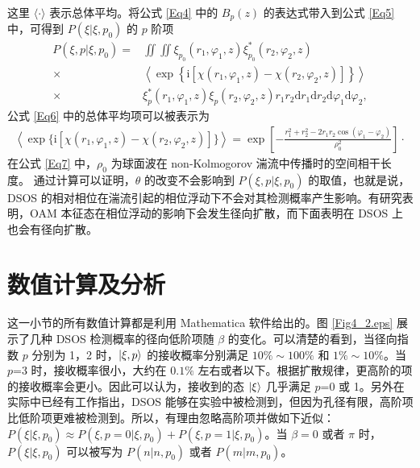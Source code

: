 \documentclass[master]{thesis-uestc}
\begin{document}
\noindent 这里 $\langle\cdot\rangle$ 表示总体平均。将公式 \eqref{Eq4} 中的 $B_p(z)$ 的表达式带入到公式 \eqref{Eq5} 中，可得到 $P(\xi|\xi,p_0)$ 的 $p$ 阶项
\begin{equation}
  \begin{split}
  P(\xi,p|\xi,p_0)=& \iint\iint\xi_{p_0}(r_1,\varphi_1,z)\xi_{p_0}^\ast(r_2,\varphi_2,z) \\
           \times& \left<\exp\left\{\mathrm{i}[\chi(r_1,\varphi_1,z)-\chi(r_2,\varphi_2,z)]\right\}\right> \\
           \times& \xi_{p}^\ast(r_1,\varphi_1,z)\xi_{p}(r_2,\varphi_2,z){r_1}{r_2}\mathrm{d}r_1\mathrm{d}r_2\mathrm{d}\varphi_1\mathrm{d}\varphi_2,
  \label{Eq6}
 \end{split}
\end{equation}
\noindent 公式 \eqref{Eq6} 中的总体平均项可以被表示为\citeup{}
\begin{equation}
\begin{split} \left<\exp\{\mathrm{i}[\chi(r_1,\varphi_1,z)-\chi(r_2,\varphi_2,z)]\}\right>=\exp\left[-\frac{r_1^{2}+r_2^{2}-2{r_1}{r_2}\cos(\varphi_1-\varphi_2)}{\rho_0^{2}}\right]
\label{Eq7}\cdot
\end{split}
\end{equation}
\noindent 在公式 \eqref{Eq7} 中，$\rho_0$ 为球面波在 non-Kolmogorov 湍流中传播时的空间相干长度。 通过计算可以证明，$\theta$ 的改变不会影响到 $P(\xi,p|\xi,p_0)$ 的取值，也就是说，DSOS 的相对相位在湍流引起的相位浮动下不会对其检测概率产生影响。有研究表明，OAM 本征态在相位浮动的影响下会发生径向扩散\citeup{}，而下面表明在 DSOS 上也会有径向扩散。

\section{数值计算及分析}

这一小节的所有数值计算都是利用 Mathematica 软件给出的。图 \ref{Fig4_2.eps} 展示了几种 DSOS 检测概率的径向低阶项随 $\beta$ 的变化。可以清楚的看到，当径向指数 $p$ 分别为 1，2 时，$\ket{\xi,p}$ 的接收概率分别满足 $10\%\sim 100\%$ 和 $1\%\sim 10\%$。当 $p$=3 时，接收概率很小，大约在 $0.1\%$ 左右或者以下。根据扩散规律，更高阶的项的接收概率会更小。因此可以认为，接收到的态 $\ket{\xi}$ 几乎满足 $p$=0 或 1。另外在实际中已经有工作指出，DSOS 能够在实验中被检测到，但因为孔径有限，高阶项比低阶项更难被检测到\citeup{}。所以，有理由忽略高阶项并做如下近似：$P(\xi|\xi,p_0)\approx P(\xi,p=0|\xi,p_0)+P(\xi,p=1|\xi,p_0)$。当 $\beta=0$ 或者 $\pi$ 时，$P(\xi|\xi,p_0)$ 可以被写为 $P(n|n,p_0)$ 或者 $P(m|m,p_0)$。
\end{document}
